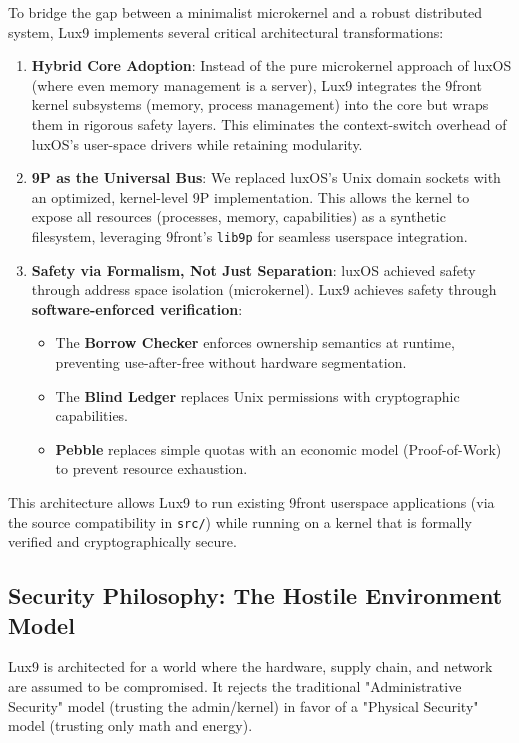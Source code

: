 \documentclass[11pt,letterpaper]{article}
\begin{document}
To bridge the gap between a minimalist microkernel and a robust distributed system, Lux9 implements several critical architectural transformations:

\begin{enumerate}
\item \textbf{Hybrid Core Adoption}: Instead of the pure microkernel approach of luxOS (where even memory management is a server), Lux9 integrates the 9front kernel subsystems (memory, process management) into the core but wraps them in rigorous safety layers. This eliminates the context-switch overhead of luxOS's user-space drivers while retaining modularity.

\item \textbf{9P as the Universal Bus}: We replaced luxOS's Unix domain sockets with an optimized, kernel-level 9P implementation. This allows the kernel to expose all resources (processes, memory, capabilities) as a synthetic filesystem, leveraging 9front's \texttt{lib9p} for seamless userspace integration.

\item \textbf{Safety via Formalism, Not Just Separation}: luxOS achieved safety through address space isolation (microkernel). Lux9 achieves safety through \textbf{software-enforced verification}:
    \begin{itemize}
    \item The \textbf{Borrow Checker} enforces ownership semantics at runtime, preventing use-after-free without hardware segmentation.
    \item The \textbf{Blind Ledger} replaces Unix permissions with cryptographic capabilities.
    \item \textbf{Pebble} replaces simple quotas with an economic model (Proof-of-Work) to prevent resource exhaustion.
    \end{itemize}
\end{enumerate}

This architecture allows Lux9 to run existing 9front userspace applications (via the source compatibility in \texttt{src/}) while running on a kernel that is formally verified and cryptographically secure.

\subsection{Security Philosophy: The Hostile Environment Model}

Lux9 is architected for a world where the hardware, supply chain, and network are assumed to be compromised. It rejects the traditional "Administrative Security" model (trusting the admin/kernel) in favor of a "Physical Security" model (trusting only math and energy).
\end{document}
